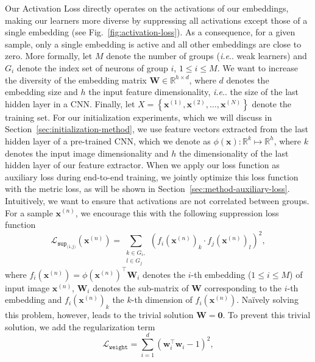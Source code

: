 \documentclass[10pt,journal,compsoc]{IEEEtran}
\makeatletter
\DeclareRobustCommand\onedot{\futurelet\@let@token\@onedot}
\def\@onedot{\ifx\@let@token.\else.\null\fi\xspace}
\def\ie{\emph{i.e}\onedot} \def\Ie{\emph{I.e}\onedot}
\makeatother
\begin{document}
Our Activation Loss directly operates on the activations of our embeddings, making our learners more diverse by suppressing
all activations except those of a single embedding (see Fig.~\ref{fig:activation-loss}). As a consequence, for a given sample, only a single embedding is active and all other embeddings 
are close to zero.
More formally, let $M$ denote the number of groups (\ie weak learners) and $G_i$ denote the index set of neurons of group 
$i$, $1 \le i \le M$. We want to increase the diversity of the embedding matrix $\boldsymbol{W} \in \mathbb{R}^{h \times d}$, 
where $d$ denotes the embedding size and $h$ the input feature dimensionality, \ie the size of the last hidden layer in a \ac{CNN}. 
Finally, let $X = \left \{ \boldsymbol{x}^{(1)}, \boldsymbol{x}^{(2)}, \ldots, \boldsymbol{x}^{(N)} \right \}$ 
denote the training set. For our initialization experiments, which we will discuss in Section~\ref{sec:initialization-method}, we use feature vectors extracted from the last 
hidden layer of a pre-trained \ac{CNN}, which we denote as $\phi(\boldsymbol{x}): \mathbb{R}^{k} \mapsto \mathbb{R}^{h}$, 
where $k$ denotes the input image dimensionality and $h$ the dimensionality of the last hidden layer of our feature extractor.
When we apply our loss function as auxiliary loss during end-to-end training, we jointly optimize this loss function with the metric loss, as will be shown in Section~\ref{sec:method-auxiliary-loss}.
Intuitively, we want to ensure that activations are not correlated between groups. 
For a sample $\boldsymbol{x}^{(n)}$, we encourage this with the following suppression loss function
\begin{equation}
    \mathcal{L}_{\texttt{sup}_\texttt{(i,j)}}(\boldsymbol{x}^{(n)}) =  \sum_{\substack{k \in G_i, \\ l \in G_j}} (f_i(\boldsymbol{x}^{(n)})_{k} \cdot f_j(\boldsymbol{x}^{(n)})_{l})^2, 
\end{equation}
where $f_i(\boldsymbol{x}^{(n)}) = \phi(\boldsymbol{x}^{(n)})^\top \boldsymbol{W}_i$ denotes the $i$-th embedding ($1 \le i \le M$) of input image $\boldsymbol{x}^{(n)}$, $\boldsymbol{W}_i$ denotes the 
sub-matrix of $\boldsymbol{W}$ corresponding to the $i$-th embedding and $f_i(\boldsymbol{x}^{(n)})_{k}$ the $k$-th dimension of $f_i(\boldsymbol{x}^{(n)})$.
Na\"ively solving this problem, however, leads to the trivial solution $\boldsymbol{W} = \boldsymbol{0}$. To prevent this trivial solution, we add the regularization term
\begin{equation}
    \label{eq:weight-act}
    \mathcal{L}_{\texttt{weight}} = \sum_{i=1}^d (\boldsymbol{w}_i^{\top} \boldsymbol{w}_i - 1)^2 ,
\end{equation}
\end{document}
